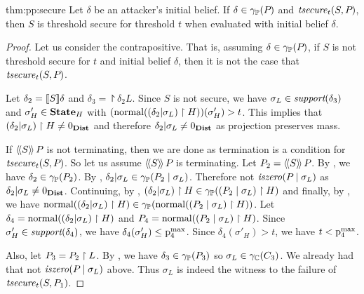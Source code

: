 \begin{reptheorem}{thm:pp:secure}
  Let $\delta$ be an attacker's initial belief.  If
  $\delta \in \ppconc{\pp{}}$ and $\abspolicy{S}{\pp{}}{t}$, then $ S
  $ is threshold secure for threshold $t$ when evaluated with initial
  belief $\delta$.
\end{reptheorem}

\begin{proof}Let us consider the contrapositive. That is, assuming
  $ \delta \in \ppconc{\pp{}} $, if $ S $ is not threshold secure for
  $ t $ and initial belief $ \delta $, then it is not the case that
  $ \abspolicy{S}{\pp{}}{t} $.

Let $ \delta_2 = \eval{S}{\delta} $ and $ \delta_3
= \project{\delta_2}{L} $. Since $ S $ is not secure, we have
$ \sigma_L \in \support{\delta_3} $ and $ \sigma'_H \in \states_H $
with $
(\normal{\project{\paren{\dcond{\delta_2}{\sigma_L}}}{H}})(\sigma'_H)
> t $. This implies that
$ \project{\paren{\dcond{\delta_2}{\sigma_L}}}{H} \neq \distzero $ and
therefore $ \dcond{\delta_2}{\sigma_L} \neq \distzero $ as projection
preserves mass.

If $ \abspevalp{S}{\pp{}} $ is not terminating, then we are done as
termination is a condition for $ \abspolicy{S}{\pp{}}{t} $. So let us
assume $ \abspevalp{S}{\pp{}} $ is terminating. Let $ \pp{2}
= \abspevalp{S}{\pp{}} $. By , we have
$ \delta_2 \in \ppconc{\pp{2}} $. By ,
$ \dcond{\delta_2}{\sigma_L} \in \ppconc{\absdcond{\pp{2}}{\sigma_L}}
$. Therefore not $ \iszero{\absdcond{\pp{}}{\sigma_L}} $ as
$ \dcond{\delta_2}{\sigma_L} \neq \distzero $. Continuing,
by ,
$ \project{ \paren{\dcond{\delta_2}{\sigma_L}}}{H} \in \ppconc{\project{\paren{\absdcond{\pp{2}}{\sigma_L}}}{H}}
$ and finally, by , we have
$ \normal{\project{\paren{\dcond{\delta_2}{\sigma_L}}}{H}} \in \ppconc{\normal{\project{\paren{\absdcond{\pp{2}}{\sigma_L}}}{H}}}
$. Let $ \delta_4
= \normal{\project{\paren{\dcond{\delta_2}{\sigma_L}}}{H}} $ and
$ \pp{4} = \normal{\project{\paren{\absdcond{\pp{2}}{\sigma_L}}}{H}}
$. Since $ \sigma'_H \in \support{\delta_4} $, we have
$ \delta_4(\sigma'_H) \leq \pmax{4} $. Since $ \delta_4(\sigma'_H) > t
$, we have $ t < \pmax{4} $.

Also, let $ \pp{3} = \project{\pp{2}}{L} $. By ,
we have $ \delta_3 \in \ppconc{\pp{3}} $ so
$ \sigma_L \in \pconc{\poly_3} $. We already had that not
$ \iszero{\absdcond{\pp{}}{\sigma_L}} $ above. Thus $ \sigma_L $ is indeed the
witness to the failure of $ \abspolicy{S}{\pp{1}}{t} $.
\end{proof}

